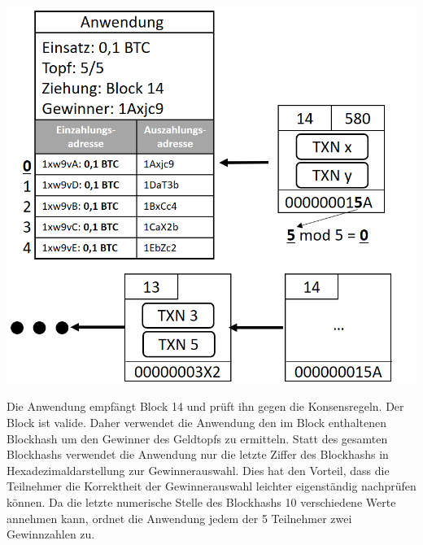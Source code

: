 \vspace{1cm}
\begin{minipage}{0.55\textwidth}
\includegraphics[width=\textwidth]{Figures/konzept_btc/konzept10}
\centering
\decoRule
{}
\label{fig:konzept10}
\end{minipage}
\begin{minipage}{0.45\textwidth}
Die Anwendung empfängt Block 14 und prüft ihn gegen die Konsensregeln. Der Block ist valide. Daher verwendet die Anwendung den im Block enthaltenen Blockhash um den Gewinner des Geldtopfs zu ermitteln. Statt des gesamten Blockhashs verwendet die Anwendung nur die letzte Ziffer des Blockhashs in Hexadezimaldarstellung zur Gewinnerauswahl. Dies hat den Vorteil, dass die Teilnehmer die Korrektheit der Gewinnerauswahl leichter eigenständig nachprüfen können.
Da die letzte numerische Stelle des Blockhashs 10 verschiedene Werte annehmen kann, ordnet die Anwendung jedem der 5 Teilnehmer zwei Gewinnzahlen zu.
\end{minipage}

